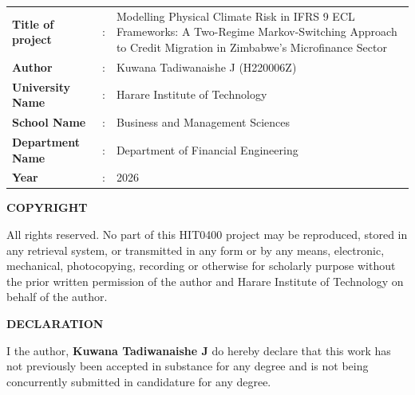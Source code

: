 \documentclass[12pt,a4paper]{article}
\begin{document}
\begin{tabular}{@{}p{4.5cm}p{0.5cm}p{10cm}@{}}
\textbf{Title of project} & : & Modelling Physical Climate Risk in IFRS 9 ECL Frameworks: A Two-Regime Markov-Switching Approach to Credit Migration in Zimbabwe's Microfinance Sector \\[1cm]
\textbf{Author} & : & Kuwana Tadiwanaishe J (H220006Z) \\[0.8cm]
\textbf{University Name} & : & Harare Institute of Technology \\[0.8cm]
\textbf{School Name} & : & Business and Management Sciences \\[0.8cm]
\textbf{Department Name} & : & Department of Financial Engineering \\[0.8cm]
\textbf{Year} & : & 2026 \\
\end{tabular}

\newpage

\thispagestyle{empty}

\begin{center}
{\Large\bfseries COPYRIGHT}
\end{center}

\vspace{1.5cm}

All rights reserved. No part of this HIT0400 project may be reproduced, stored in any retrieval system, or transmitted in any form or by any means, electronic, mechanical, photocopying, recording or otherwise for scholarly purpose without the prior written permission of the author and Harare Institute of Technology on behalf of the author.

\newpage

\thispagestyle{empty}

\begin{center}
{\Large\bfseries DECLARATION}
\end{center}

\vspace{1.5cm}

I the author, \textbf{Kuwana Tadiwanaishe J} do hereby declare that this work has not previously been accepted in substance for any degree and is not being concurrently submitted in candidature for any degree.

\vspace{2cm}
\end{document}
